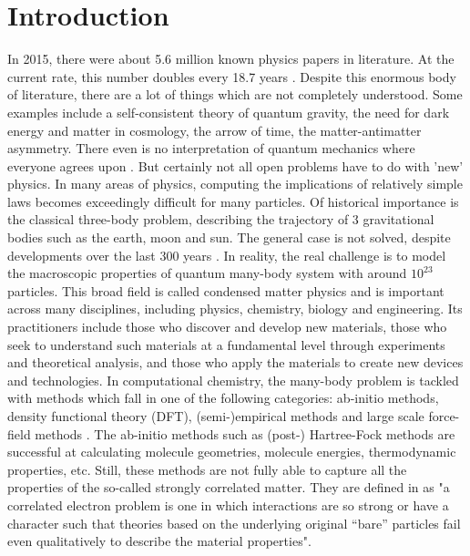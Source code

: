 
\section{Introduction}

In 2015, there were about 5.6 million known physics papers in literature. At the current rate, this number doubles every 18.7 years \cite{Sinatra2015}. Despite this enormous body of literature, there are a lot of things which are not completely understood. Some examples include a self-consistent theory of quantum gravity, the need for dark energy and matter in cosmology, the arrow of time, the matter-antimatter asymmetry. There even is no interpretation of quantum mechanics where everyone agrees upon \cite{Lulea2015}.
But certainly not all open problems have to do with 'new' physics. In many areas of physics, computing the implications of relatively simple laws becomes exceedingly difficult for many particles. Of historical importance is the classical three-body problem, describing the trajectory of 3 gravitational bodies such as the earth, moon and sun. The general case is not solved, despite developments over the last 300 years \cite{Musielak2014}.
In reality, the real challenge is to model the macroscopic properties of quantum many-body system with around $10^{23}$ particles. This broad field is called condensed matter physics and is important across many disciplines, including physics, chemistry, biology and engineering. Its practitioners include those who discover and develop new materials, those who seek to understand such materials at a fundamental level through experiments and theoretical analysis, and those who apply the materials to create new devices and technologies.  \cite{Mora-Aznar2000}
In computational chemistry, the many-body problem is tackled with methods which fall in one of the following categories: ab-initio methods, density functional theory (DFT), (semi-)empirical methods and large scale force-field methods \cite{Lewars2011}. The ab-initio methods such as (post-) Hartree-Fock methods are successful at calculating molecule geometries, molecule energies, thermodynamic properties, etc. \cite{Lewars2011}
Still, these methods are not fully able to capture all the properties of the so-called strongly correlated matter. They are defined in \cite{Alexandradinata2020} as "a correlated electron problem is one in which interactions are so strong or have a character such that theories based on the underlying original “bare” particles fail even qualitatively to describe the material properties".
